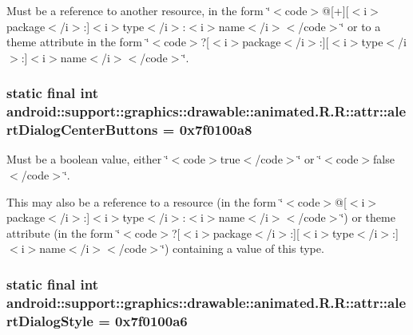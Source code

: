 Must be a reference to another resource, in the form \char`\"{}$<$code$>$@\mbox{[}+\mbox{]}\mbox{[}$<$i$>$package$<$/i$>$:\mbox{]}$<$i$>$type$<$/i$>$:$<$i$>$name$<$/i$>$$<$/code$>$\char`\"{} or to a theme attribute in the form \char`\"{}$<$code$>$?\mbox{[}$<$i$>$package$<$/i$>$:\mbox{]}\mbox{[}$<$i$>$type$<$/i$>$:\mbox{]}$<$i$>$name$<$/i$>$$<$/code$>$\char`\"{}. \hypertarget{classandroid_1_1support_1_1graphics_1_1drawable_1_1animated_1_1_r_1_1attr_ac0e0f41c8f9e7ae04be22df892bb49d}{
\subsubsection[{alertDialogCenterButtons}]{\setlength{\rightskip}{0pt plus 5cm}static final int android::support::graphics::drawable::animated.R.R::attr::alertDialogCenterButtons = 0x7f0100a8}}
\label{classandroid_1_1support_1_1graphics_1_1drawable_1_1animated_1_1_r_1_1attr_ac0e0f41c8f9e7ae04be22df892bb49d}


Must be a boolean value, either \char`\"{}$<$code$>$true$<$/code$>$\char`\"{} or \char`\"{}$<$code$>$false$<$/code$>$\char`\"{}. 

This may also be a reference to a resource (in the form \char`\"{}$<$code$>$@\mbox{[}$<$i$>$package$<$/i$>$:\mbox{]}$<$i$>$type$<$/i$>$:$<$i$>$name$<$/i$>$$<$/code$>$\char`\"{}) or theme attribute (in the form \char`\"{}$<$code$>$?\mbox{[}$<$i$>$package$<$/i$>$:\mbox{]}\mbox{[}$<$i$>$type$<$/i$>$:\mbox{]}$<$i$>$name$<$/i$>$$<$/code$>$\char`\"{}) containing a value of this type. \hypertarget{classandroid_1_1support_1_1graphics_1_1drawable_1_1animated_1_1_r_1_1attr_bb1736799b85965c2a39d07c5024e5af}{
\subsubsection[{alertDialogStyle}]{\setlength{\rightskip}{0pt plus 5cm}static final int android::support::graphics::drawable::animated.R.R::attr::alertDialogStyle = 0x7f0100a6}}
\label{classandroid_1_1support_1_1graphics_1_1drawable_1_1animated_1_1_r_1_1attr_bb1736799b85965c2a39d07c5024e5af}


